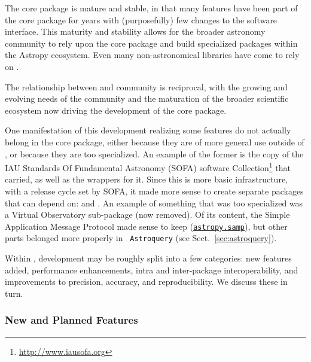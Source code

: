 \documentclass[modern]{aastex631}
\newcommand{\astropysubpkg}[1]{\href{http://docs.astropy.org/en/stable/#1/index.html}{\texttt{astropy.#1}}\xspace}
\begin{document}
  The \astropypkg core package is mature and stable, in that many features have
  been part of the core package for years with (purposefully) few changes to the
  software interface. This maturity and stability allows for the broader
  astronomy \python community to rely upon the \astropypkg core package and
  build specialized packages within the Astropy ecosystem. Even many
  non-astronomical \python libraries have come to rely on \astropypkg.

  The relationship between \astropy and community is reciprocal, with the
  growing and evolving needs of the community and the maturation of the broader
  scientific \python ecosystem now driving the development of the \astropypkg
  core package.

  One manifestation of this development realizing some features do not actually
  belong in the core package, either because they are of more general use
  outside of \astropypkg, or because they are too specialized. An example of the
  former is the copy of the IAU Standards Of Fundamental Astronomy (SOFA)
  software Collection\footnote{\url{http://www.iausofa.org}} \citep{sofa} that
  \astropy carried, as well as the \python wrappers for it.  Since this is more
  basic infrastructure, with a release cycle set by SOFA, it made more sense to
  create separate packages that \astropypkg can depend on: 
  \citep{erfa} and  \citep{pyerfa}. An example of something that
  was too specialized was a Virtual Observatory sub-package (now removed).  Of
  its content, the Simple Application Message Protocol made sense to keep
  (\astropysubpkg{samp}), but other parts belonged more properly in {\tt
  Astroquery} (see Sect.~\ref{sec:astroquery}).

  Within \astropypkg, development may be roughly split into a few categories:
  new features added, performance enhancements, intra and inter-package
  interoperability, and improvements to precision, accuracy, and
  reproducibility. We discuss these in turn.


\subsubsection*{New and Planned Features} \label{sec:core-features-new}

\end{document}
